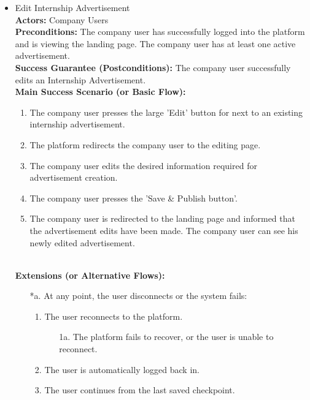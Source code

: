 \begin{itemize}[label={[\textbf{UC}]}, align=left, leftmargin=*]
     \item {} Edit Internship Advertisement \\
     \textbf{Actors:} Company Users\\
     \textbf{Preconditions:} The company user has successfully logged into the platform and is viewing the landing page. The company user has at least one active advertisement.\\
     \textbf{Success Guarantee (Postconditions):} The company user successfully edits an Internship Advertisement. \\
     \textbf{Main Success Scenario (or Basic Flow):} 
     \begin{enumerate}[label=\arabic*.] 
        \item The company user presses the large 'Edit' button for next to an existing internship advertisement. 
        \item The platform redirects the company user to the editing page.
        \item The company user edits the desired information required for advertisement creation.
        \item The company user presses the 'Save \& Publish button'.
        \item The company user is redirected to the landing page and informed that the advertisement edits have been made. The company user can see his newly edited advertisement.
     \end{enumerate} \\

    \textbf{Extensions (or Alternative Flows):} 
    \begin{enumerate}[label=\arabic*.]
        \item[*a.] At any point, the user disconnects or the system fails:
            \begin{enumerate}[label=\arabic*.]
                \item The user reconnects to the platform.
                    \begin{enumerate}[label=\alph*.]
                        \item[1a.] The platform fails to recover, or the user is unable to reconnect.
                    \end{enumerate}
                 \item The user is automatically logged back in.
                 \item The user continues from the last saved checkpoint.
            \end{enumerate}
        

\end{enumerate}
\end{itemize}
